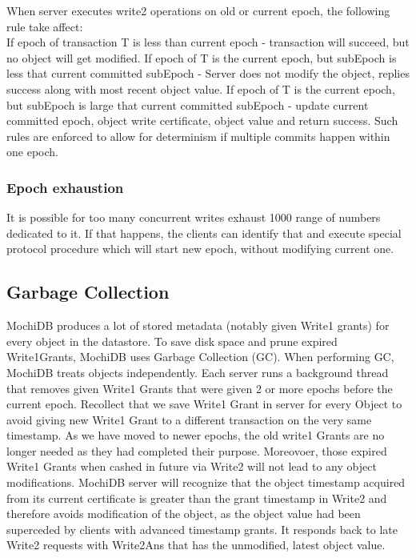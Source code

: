 \documentclass[letterpaper,twocolumn,10pt]{article}
\begin{document}
When server executes write2 operations on old or current epoch, the following rule take affect:\\ If epoch of transaction T is less than current epoch - transaction will succeed, but no object will get modified. If epoch of T is the current epoch, but subEpoch is less that current committed subEpoch - Server does not modify the object, replies success along with most recent object value. If epoch of T is the current epoch, but subEpoch is large that current committed subEpoch - update current committed epoch, object write certificate, object value and return success. Such rules are enforced to allow for determinism if multiple commits happen within one epoch.

\subsubsection{Epoch exhaustion}
It is possible for too many concurrent writes exhaust 1000 range of numbers dedicated to it. If that happens, the clients can identify that and execute special protocol procedure which will start new epoch, without modifying current one.

\subsection{Garbage Collection}
MochiDB produces a lot of stored metadata (notably given Write1 grants) for every object in the datastore. To save disk space and prune expired Write1Grants, MochiDB uses Garbage Collection (GC). When performing GC, MochiDB treats objects independently. Each server runs a background thread that removes given Write1 Grants that were given 2 or more epochs before the current epoch. Recollect that we save Write1 Grant in server for every Object to avoid giving new Write1 Grant to a different transaction on the very same timestamp. As we have moved to newer epochs, the old write1 Grants are no longer needed as they had completed their purpose. Moreovoer, those expired Write1 Grants when cashed in future via Write2 will not lead to any object modifications. MochiDB server will recognize that the object timestamp acquired from its current certificate is greater than the grant timestamp in Write2 and therefore avoids modification of the object, as the object value had been superceded by clients with advanced timestamp grants. It responds back to late Write2 requests with Write2Ans that has the unmodified, latest object value.
\end{document}
